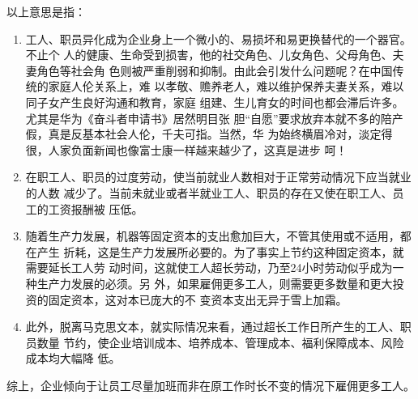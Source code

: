 以上意思是指：
\begin{enumerate}
\item 工人、职员异化成为企业身上一个微小的、易损坏和易更换替代的一个器官。不止个
  人的健康、生命受到损害，他的社交角色、儿女角色、父母角色、夫妻角色等社会角
  色则被严重削弱和抑制。由此会引发什么问题呢？在中国传统的家庭人伦关系上，难
  以孝敬、赡养老人，难以维护保养夫妻关系，难以同子女产生良好沟通和教育，家庭
  组建、生儿育女的时间也都会滞后许多。尤其是华为《奋斗者申请书》居然明目张
  胆“自愿”要求放弃本就不多的陪产假，真是反基本社会人伦，千夫可指。当然，华
  为始终横眉冷对，淡定得很，人家负面新闻也像富士康一样越来越少了，这真是进步
  呵！

\item 在职工人、职员的过度劳动，使当前就业人数相对于正常劳动情况下应当就业的人数
  减少了。当前未就业或者半就业工人、职员的存在又使在职工人、员工的工资报酬被
  压低。

\item 随着生产力发展，机器等固定资本的支出愈加巨大，不管其使用或不适用，都在产生
  折耗，这是生产力发展所必要的。为了事实上节约这种固定资本，就需要延长工人劳
  动时间，这就使工人超长劳动，乃至24小时劳动似乎成为一种生产力发展的必须。另
  外，如果雇佣更多工人，则需要更多数量和更大投资的固定资本，这对本已庞大的不
  变资本支出无异于雪上加霜。

\item 此外，脱离马克思文本，就实际情况来看，通过超长工作日所产生的工人、职员数量
  节约，使企业培训成本、培养成本、管理成本、福利保障成本、风险成本均大幅降
  低。
\end{enumerate}

综上，企业倾向于让员工尽量加班而非在原工作时长不变的情况下雇佣更多工人。




